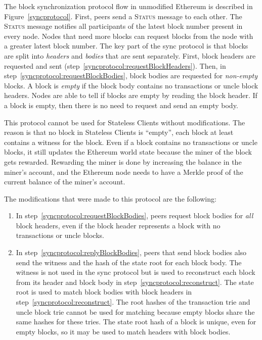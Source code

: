 \documentclass[12pt]{article}
\newcounter{protocol}
\newcommand{\System}{Stateless Clients\xspace}
\begin{document}
The block synchronization protocol flow in unmodified Ethereum is described in Figure~\ref{syncprotocol}. First, peers send a \textsc{Status} message to each other. The \textsc{Status} message notifies all participants of the latest block number present in every node. Nodes that need more blocks can request blocks from the node with a greater latest block number. The key part of the sync protocol is that blocks are split into \emph{headers} and \emph{bodies} that are sent separately. First, block headers are requested and sent (step~\ref{syncprotocol:requestBlockHeaders}). Then, in step~\ref{syncprotocol:requestBlockBodies}, block bodies are requested for \emph{non-empty} blocks. A block is \emph{empty} if the block body contains no transactions or uncle block headers. Nodes are able to tell if blocks are empty by reading the block header. If a block is empty, then there is no need to request and send an empty body.


This protocol cannot be used for \System without modifications. The reason is that no block in \System is ``empty'', each block at least contains a witness for the block. Even if a block contains no transactions or uncle blocks, it still updates the Ethereum world state because the miner of the block gets rewarded. Rewarding the miner is done by increasing the balance in the miner's account, and the Ethereum node needs to have a Merkle proof of the current balance of the miner's account.

The modifications that were made to this protocol are the following:
\begin{enumerate}
  \item In step~\ref{syncprotocol:requestBlockBodies}, peers request block bodies for \emph{all} block headers, even if the block header represents a block with no transactions or uncle blocks.
  \item In step~\ref{syncprotocol:replyBlockBodies}, peers that send block bodies also send the witness and the hash of the state root for each block body. The witness is not used in the sync protocol but is used to reconstruct each block from its header and block body in step~\ref{syncprotocol:reconstruct}. The state root is used to match block bodies with block headers in step~\ref{syncprotocol:reconstruct}. The root hashes of the transaction trie and uncle block trie cannot be used for matching because empty blocks share the same hashes for these tries. The state root hash of a block is unique, even for empty blocks, so it may be used to match headers with block bodies.
\end{enumerate}
\end{document}
